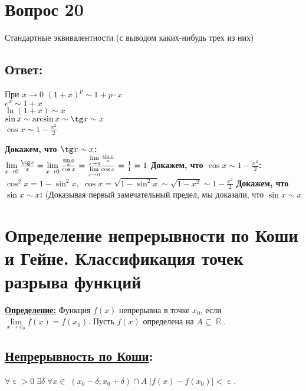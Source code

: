 \documentclass{article}
\DeclareMathOperator{\Exists}{\exists}
\DeclareMathOperator{\eps}{\varepsilon}
\DeclareMathOperator{\Forall}{\forall}
\DeclareMathOperator{\re}{\mathbb{R}}
\newcommand\abs[1]{\left|#1\right|}
\begin{document}
\section*{Вопрос 20}
\begin{center}
  Стандартные эквивалентности (с выводом каких-нибудь трех из них)
\end{center}
\subsection*{Ответ:}
\begin{center}
При $x \to 0$
  $(1 + x)^p \sim 1 + p \cdot x$\\
  $e^x \sim 1 + x$\\
  $\ln(1+x) \sim x$\\
  $\sin x \sim \arcsin x \sim \tg x \sim x$\\
  $\cos x \sim 1 - \frac{x^2}{2}$\\
\end{center}
\textbf{Докажем, что $\tg x \sim x$:}\\
$\lim\limits_{x \to 0} \frac{\tg x}{x} = \lim\limits_{x \to 0} \frac{\frac{\sin x}{x}}{\cos x} =
\frac{\lim\limits_{x \to 0} \frac{\sin x}{x}}{\lim\limits_{x \to 0} \cos x} = \frac{1}{1} = 1$\newline
\textbf{Докажем, что $\cos x \sim 1 - \frac{x^2}{2}$:}\\
$\cos^2 x = 1 - \sin^2 x, \; \cos x = \sqrt{1 - \sin^2 x} \sim \sqrt{1 - x^2} \sim 1 - \frac{x^2}{2}$\newline
\textbf{Докажем, что $\sin x \sim x$:}\newline
(Доказывая первый замечательный предел, мы доказали, что $\sin x \sim x$\\
 
\section{Определение непрерывности по Коши и Гейне. Классификация точек разрыва функций}
   
   \textbf{\underline{Определение:}} Функция $f(x)$ непрерывна в точке $x_0$, если $\lim\limits_{x\to x_0} f(x) = f(x_0)$.\newline
   Пусть $f(x)$ определена на $A\subseteq\re$.\newline
   \subsection*{\underline{Непрерывность по Коши}:}
       $\Forall\eps > 0\;\Exists\delta\;\Forall x\in\;(x_0 - \delta; x_0 + \delta)\cap A\;\abs{f(x) - f(x_0)} < \eps$.
\end{document}
